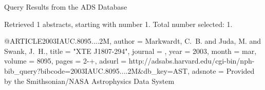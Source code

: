 Query Results from the ADS Database


Retrieved 1 abstracts, starting with number 1.  Total number selected: 1.

@ARTICLE{2003IAUC.8095....2M,
   author = {{Markwardt}, C.~B. and {Juda}, M. and {Swank}, J.~H.},
    title = "{XTE J1807-294}",
  journal = {\iaucirc},
     year = 2003,
    month = mar,
   volume = 8095,
    pages = {2-+},
   adsurl = {http://adsabs.harvard.edu/cgi-bin/nph-bib_query?bibcode=2003IAUC.8095....2M&db_key=AST},
  adsnote = {Provided by the Smithsonian/NASA Astrophysics Data System}
}


